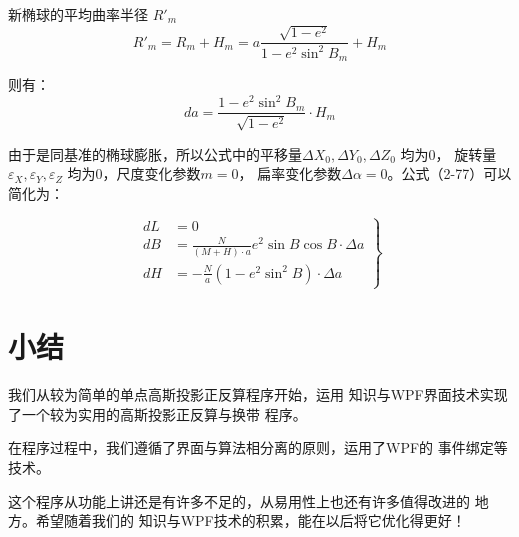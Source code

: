 新椭球的平均曲率半径 $R'_m$
$$R'_m = R_m + H_m = a \frac{\sqrt{1-e^2}}{1-e^2 \sin^2 B_m} + H_m$$

则有：
$$da = \frac{1-e^2 \sin ^2 B_m}{\sqrt{1-e^2}} \cdot H_m$$

由于是同基准的椭球膨胀，所以公式中的平移量$\Delta X_0, \Delta Y_0, \Delta Z_0$ 均为0，
旋转量$\varepsilon_X, \varepsilon_Y, \varepsilon_Z$ 均为0，尺度变化参数$m=0$， 扁率变化参数$\Delta \alpha=0$。公式（2-77）可以简化为：


$$
    \left .
    \begin{aligned}
        dL & = 0                                                        \\
        dB & = \frac{N}{(M+H) \cdot a} e^2 \sin B \cos B \cdot \Delta a \\
        dH & = -\frac{N}{a}(1-e^2 \sin ^2 B ) \cdot \Delta a
    \end{aligned}
    \right \}
$$


\section*{小结}

我们从较为简单的单点高斯投影正反算程序开始，运用
\cs 知识与WPF界面技术实现了一个较为实用的高斯投影正反算与换带
程序。

在程序过程中，我们遵循了界面与算法相分离的原则，运用了WPF的
事件绑定等技术。

这个程序从功能上讲还是有许多不足的，从易用性上也还有许多值得改进的
地方。希望随着我们的 \cs 知识与WPF技术的积累，能在以后将它优化得更好！



